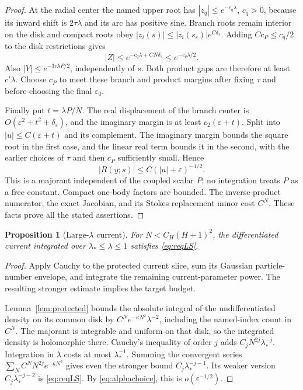 \documentclass[11pt]{article}
\numberwithin{equation}{section}
\newtheorem{proposition}[theorem]{Proposition}
\theoremstyle{definition}
\newcommand{\eps}{\varepsilon}
\begin{document}
\begin{proof}
At the radial center the named upper root has
\(|z_q|\le e^{-c_q\lambda}\), \(c_q>0\), because its inward
shift is \(2\tau\lambda\) and its arc has positive sine.
Branch roots remain interior on the disk and compact roots obey
\(|z_i(s)|\le |z_i(s_\eps)|e^{C\delta_s}\).
Adding \(Cc_P\le c_q/2\) to the disk restrictions gives
\[
 |Z|\le e^{-c_q\lambda+CN\delta_s}\le e^{-c_q\lambda/2}.
\]
Also \(|Y|\le e^{-3\tau\lambda P/2}\), independently of \(s\).
Both product gaps are therefore at least \(c'\lambda\).
Choose \(c_P\) to meet these branch and product margins after fixing
\(\tau\) and before choosing the final \(\eps_0\).

Finally put \(t=\lambda P/N\). The real displacement of the
branch center is \(O(\eps^2+t^2+\delta_s)\), and the imaginary
margin is at least \(c_2(\eps+t)\).
Split into \(|u|\le C(\eps+t)\) and its complement.
The imaginary margin bounds the square root in the first
case, and the linear real term bounds it in the second, with
the earlier choices of \(\tau\) and then \(c_P\) sufficiently small. Hence
\[
 |R(y;s)|\le C(|u|+\eps)^{-1/2}.
\]
This is a majorant independent of the coupled scalar \(P\);
no integration treats \(P\) as a free constant. Compact
one-body factors are bounded. The inverse-product numerator,
the exact Jacobian, and its Stokes replacement minor cost
\(C^N\). These facts prove all the stated assertions.
\end{proof}

\begin{proposition}[Large-\(\lambda\) current]\label{prop:largeS}
For \(N<C_H(H+1)^2\), the differentiated current integrated over
\(\lambda_*\le\lambda\le1\) satisfies \eqref{eq:reqLS}.
\end{proposition}
\begin{proof}
Apply Cauchy to the protected current slice, sum its Gaussian particle-number envelope, and integrate the remaining current-parameter power. The resulting stronger estimate implies the target budget.

Lemma~\ref{lem:protected} bounds the absolute integral of
the undifferentiated density on its common disk by
\(C^Ne^{-\kappa N^2}\lambda^{-2}\), including the named-index
count in \(C^N\). The majorant is integrable and uniform on
that disk, so the integrated density is holomorphic there.
Cauchy's inequality of order \(j\) adds
\(C_jN^{2j}\lambda_*^{-j}\). Integration in \(\lambda\) costs
at most \(\lambda_*^{-1}\). Summing the convergent series
\(\sum_N C^NN^{2j}e^{-\kappa N^2}\) gives even the stronger
bound \(C_j\lambda_*^{-j-1}\). Its weaker version
\(C_j\lambda_*^{-j-2}\) is \eqref{eq:reqLS}.
By \eqref{eq:alphachoice}, this is \(o(\eps^{-1/2})\).
\end{proof}
\end{document}
